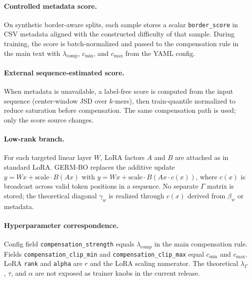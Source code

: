 \documentclass[12pt,letterpaper]{article}
\begin{document}
\paragraph{Controlled metadata score.}
On synthetic border-aware splits, each sample stores a scalar \texttt{border\_score} in CSV metadata aligned with the constructed difficulty of that sample. During training, the score is batch-normalized and passed to the compensation rule in the main text with $\lambda_{\mathrm{comp}}$, $c_{\min}$, and $c_{\max}$ from the YAML config.

\paragraph{External sequence-estimated score.}
When metadata is unavailable, a label-free score is computed from the input sequence (center-window JSD over $k$-mers), then train-quantile normalized to reduce saturation before compensation. The same compensation path is used; only the score source changes.

\paragraph{Low-rank branch.}
For each targeted linear layer $W$, LoRA factors $A$ and $B$ are attached as in standard LoRA. GERM-BO replaces the additive update $y = Wx + \mathrm{scale}\cdot B(Ax)$ with $y = Wx + \mathrm{scale}\cdot B(Ax \cdot c(x))$, where $c(x)$ is broadcast across valid token positions in a sequence. No separate $\Gamma$ matrix is stored; the theoretical diagonal $\gamma_w$ is realized through $c(x)$ derived from $\beta_w$ or metadata.

\paragraph{Hyperparameter correspondence.}
Config field \texttt{compensation\_strength} equals $\lambda_{\mathrm{comp}}$ in the main compensation rule. Fields \texttt{compensation\_clip\_min} and \texttt{compensation\_clip\_max} equal $c_{\min}$ and $c_{\max}$. LoRA \texttt{rank} and \texttt{alpha} are $r$ and the LoRA scaling numerator. The theoretical $\lambda_{\Gamma}$, $\tau$, and $\alpha$ are not exposed as trainer knobs in the current release.
\end{document}
